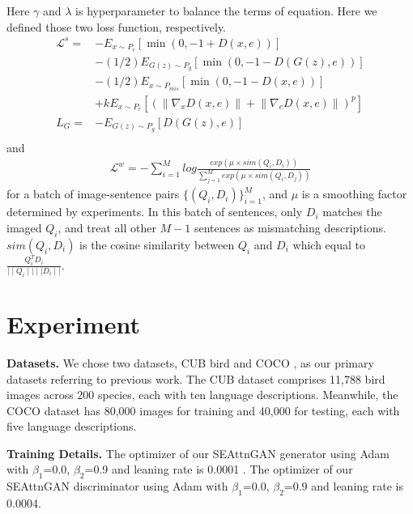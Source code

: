 \documentclass[runningheads, orivec]{llncs}
\begin{document}
Here $\gamma$  and $\lambda$ is hyperparameter to balance the terms of equation.
Here we defined those two loss function, respectively.
\begin{equation}
\begin{aligned}
\mathcal{L}^{s}= & - E _{x \sim P _r}[\min (0,-1+D(x, e))] \\
& -(1 / 2) E _{G(z) \sim P _g}[\min (0,-1-D(G(z), e))] \\
& -(1 / 2) E _{x \sim P _{m i s}}[\min (0,-1-D(x, e))] \\
& +k E _{x \sim P _r}\left[\left(\left\|\nabla_x D(x, e)\right\|+\left\|\nabla_e D(x, e)\right\|\right)^p\right] \\
L_G= & - E _{G(z) \sim P _g}[D(G(z), e)] \\
\end{aligned}
\end{equation}
and
\begin{equation}
    \begin{aligned}
        \mathcal{L}^{w} = -\sum^{M}_{i=1} log \frac{exp(\mu \times sim(Q_{i},D_{i}))}{\sum^{M}_{j=1}exp(\mu \times sim(Q_{i},D_{j}))}
        \end{aligned}
\end{equation}
for a batch of image-sentence pairs $\{(Q_{i},D_{i})\}^{M}_{i=1}$, and $\mu$ is a smoothing factor determined by experiments. In this batch of sentences, only $D_{i}$ matches the imaged $Q_{i}$, and treat all other $M-1$ sentences as mismatching descriptions. $sim(Q_{i},D_{i})$ is the cosine similarity between $Q_{i}$ and $D_{i}$ which equal to $\frac{Q_{i}^{T}D_{i}}{\mid \mid Q_{i}\mid \mid \mid \mid D_{i}\mid \mid  } $.

\section{Experiment}

\textbf{Datasets.} We chose two datasets, CUB bird \cite{WahCUB_200_2011} and COCO \cite{lin2014microsoft}, as our primary datasets referring to previous work. The CUB dataset comprises 11,788 bird images across 200 species, each with ten language descriptions. Meanwhile, the COCO dataset has 80,000 images for training and 40,000 for testing, each with five language descriptions.

\noindent \textbf{Training Details.} The optimizer of our SEAttnGAN generator using Adam with $\beta_{1}$=0.0, $\beta_{2}$=0.9 and leaning rate is 0.0001 \cite{kingma2014adam}. The optimizer of our SEAttnGAN discriminator using Adam with $\beta_{1}$=0.0, $\beta_{2}$=0.9 and leaning rate is 0.0004.
\end{document}
